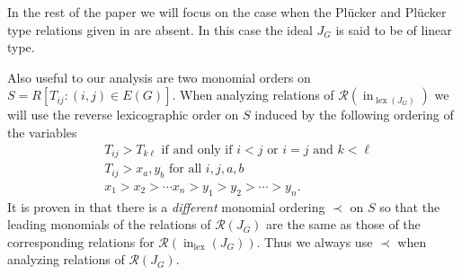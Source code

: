 \documentclass[reqno]{amsart}
\theoremstyle{definition}
\theoremstyle{remark}
\numberwithin{equation}{section}
\newcommand{\R}{\ensuremath{\mathcal{R}}}
\DeclareMathOperator{\init}{in}
\DeclareMathOperator{\lex}{lex}
\begin{document}
In the rest of the paper we will focus on the case when the Pl\"ucker and Pl\"ucker type relations given in  are absent. In this case the ideal $J_G$ is said to be of linear type.  

Also useful to our analysis are two monomial orders on $S=R[T_{ij}: (i,j)\in E(G)]$. When analyzing relations of $\R(\init_{\lex(J_G)})$ we will use the reverse lexicographic order on $S$ induced by the following ordering of the variables
 \begin{equation}\label{eq:revlex}
 \begin{aligned}
 &T_{ij} > T_{k\ell}  \text{ if and only if } i<j \text{ or } i=j \text{ and } k<\ell\\
 &T_{ij}> x_a, y_b  \text{ for all } i,j,a,b\\
 &x_1>x_2 > \cdots x_n> y_1> y_2> \cdots >y_n.
\end{aligned}
\end{equation}
It is proven in \cite[Theorem 3.14]{ALL} that there is a {\em different} monomial ordering $\prec$ on $S$ so that the leading monomials of the relations of $\mathcal{R}(J_G)$ are the same as those of the corresponding relations for $\R(\init_{\lex}(J_G))$.
Thus we always use $\prec$ when analyzing relations of $\mathcal{R}(J_G)$.
\end{document}
